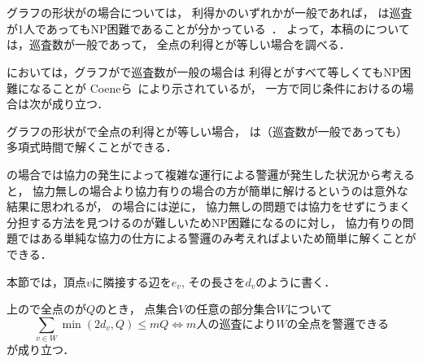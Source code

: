 \section{{\graphStar}}
\label{section: star}

グラフの形状が{\graphStar}の場合については，
利得か{\idletime}のいずれかが一般であれば，
{\patProb}は巡査が1人であってもNP困難であることが分かっている~\cite{coene2011charlemagne}．
よって，本稿の{\patProb}については，巡査数が一般であって，
全点の利得と{\idletime}が等しい場合を調べる．

{\assignedPatProb}においては，グラフが{\graphStar}で巡査数が一般の場合は
利得と{\idletime}がすべて等しくてもNP困難になることが
Coeneら~\cite{coene2011charlemagne}により示されているが，
一方で同じ条件における{\patProb}の場合は次が成り立つ．

\begin{theo}
  \label{theo:StarEqualProfitTimelimit}
  グラフの形状が{\graphStar}で全点の利得と{\idletime}が等しい場合，
  {\patProb}は（巡査数が一般であっても）多項式時間で解くことができる．
\end{theo}


{\graphLine}の場合では協力の発生によって複雑な運行による警邏が発生した状況から考えると，
協力無しの場合より協力有りの場合の方が簡単に解けるというのは意外な結果に思われるが，
{\graphStar}の場合には逆に，
協力無しの問題では協力をせずにうまく分担する方法を見つけるのが難しいためNP困難になるのに対し，
協力有りの問題ではある単純な協力の仕方による警邏のみ考えればよいため簡単に解くことができる．


本節では，頂点$v$に隣接する辺を$e_v$, その長さを$d_v$のように書く．

\begin{lemm}
  \label{lemm:condition_of_guarding_star}
  {\graphStar}上の{\patProb}で全点の{\idletime}が$Q$のとき，
  点集合$V$の任意の部分集合$W$について
  $$
    \sum_{v \in W} \min(2d_v, Q) \leq mQ
    \iff \text{$m$人の巡査により$W$の全点を警邏できる}
  $$
  が成り立つ．
\end{lemm}





